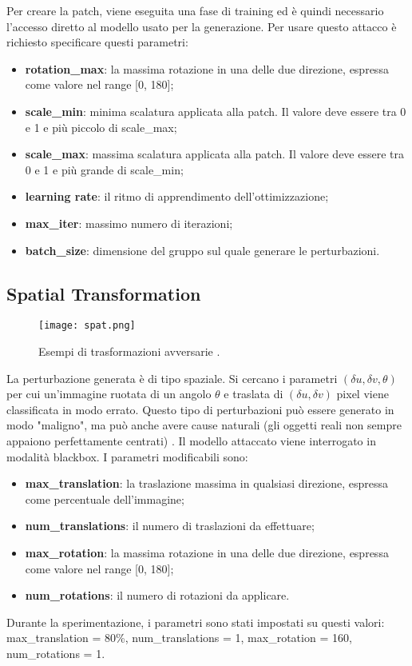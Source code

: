 Per creare la patch, viene eseguita una fase di training ed è quindi necessario l'accesso diretto al modello usato per la generazione.  Per usare questo attacco è richiesto specificare questi parametri:\begin{itemize}
    \item \textbf{rotation\_max}: la massima rotazione in una delle due direzione, espressa come valore nel range [0, 180];
    \item \textbf{scale\_min}: minima scalatura applicata alla patch. Il valore deve essere tra 0 e 1 e più piccolo di scale\_max;
    \item \textbf{scale\_max}: massima scalatura applicata alla patch. Il valore deve essere tra 0 e 1 e più grande di scale\_min;
    \item \textbf{learning rate}: il ritmo di apprendimento dell'ottimizzazione;
    \item \textbf{max\_iter}: massimo numero di iterazioni;
    \item \textbf{batch\_size}: dimensione del gruppo sul quale generare le perturbazioni.
\end{itemize}
\subsection{Spatial Transformation}
\begin{figure}[h]
    \texttt{[image: spat.png]}
    \caption{Esempi di trasformazioni avversarie \cite{spatial}.}
    \label{fig:spat}
\end{figure}
La perturbazione generata è di tipo spaziale. Si cercano i parametri $(\delta u,\delta v,\theta)$ per cui un'immagine ruotata di un angolo $\theta$ e traslata di 
$(\delta u, \delta v)$ pixel viene classificata in modo errato. Questo tipo di perturbazioni può essere generato in modo "maligno", ma può anche avere cause naturali (gli oggetti reali
non sempre appaiono perfettamente centrati) \cite{spatial}. Il modello attaccato viene interrogato in modalità blackbox.
I parametri modificabili sono:\begin{itemize}
    \item \textbf{max\_translation}: la traslazione massima in qualsiasi direzione, espressa come percentuale dell'immagine;
    \item \textbf{num\_translations}: il numero di traslazioni da effettuare;
    \item \textbf{max\_rotation}: la massima rotazione in una delle due direzione, espressa come valore nel range [0, 180];
    \item \textbf{num\_rotations}: il numero di rotazioni da applicare.
\end{itemize}
Durante la sperimentazione, i parametri sono stati impostati su questi valori: max\_translation = 80\%, num\_translations = 1, max\_rotation = 160, num\_rotations = 1.
